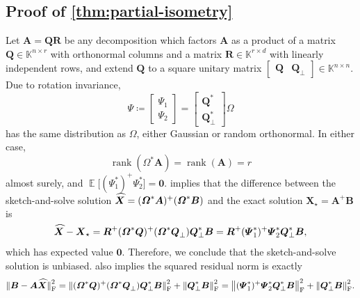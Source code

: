 \documentclass[11pt]{article}
\newcommand{\field}{\mathbb{K}}
\DeclareMathOperator{\rank}{rank}
\newcommand{\mat}[1]{\boldsymbol{#1}}
\newcommand{\norm}[1]{\mleft\| #1 \mright\|}
\newcommand{\twobyone}[2]{%
  \begin{bmatrix}#1 \\ #2\end{bmatrix}}
\DeclareMathOperator{\expect}{\mathbb{E}}
\newcommand{\hatbold}[1]{%
  \skew{4}\widehat{\smash{\boldsymbol{#1}}\mathstrut}}
\newcommand{\Xhat}{\smash{\hatbold{X}}}
\theoremstyle{definition}
\numberwithin{equation}{section}
\begin{document}
\subsection{Proof of \texorpdfstring{\cref{thm:partial-isometry}}{Theorem 2.1}} \label{sec:partial-isometry-proof}

Let $\mat{A} = \mat{Q}\mat{R}$ be any decomposition which factors $\mat{A}$ as a product of a matrix $\mat{Q} \in \field^{n\times r}$ with orthonormal columns and a matrix $\mat{R} \in \field^{r\times d}$ with linearly independent rows, and extend $\mat{Q}$ to a square unitary matrix $[\begin{matrix} \mat{Q} & \mat{Q}_\perp \end{matrix}] \in \field^{n\times n}$.
Due to rotation invariance, 
\begin{equation*}
\mat{\varPsi} \coloneqq \twobyone{\mat{\varPsi}_1}{\mat{\varPsi}_2} = \twobyone{\mat{Q}^*}{\mat{Q}_{\perp}^*} \mat{\varOmega}
\end{equation*}
has the same distribution as $\mat{\varOmega}$, either Gaussian or random orthonormal.
In either case, 
\begin{equation*}
\rank(\mat{\varOmega}^*\mat{A})=\rank(\mat{A})=r
\end{equation*}
almost surely, and $\expect \bigl[(\mat{\varPsi}_1^*)^+ \mat{\varPsi}_2^*\bigr] = \mat{0}$.
 implies that the difference between the sketch-and-solve solution $\Xhat = (\mat{\varOmega}^*\mat{A})^+(\mat{\varOmega}^*\mat{B})$ and the exact solution $\mat{X}_\star = \mat{A}^+\mat{B}$ is
%
\begin{equation*}
    \Xhat - \mat{X}_\star 
    = \mat{R}^+ (\mat{\varOmega}^*\mat{Q})^+(\mat{\varOmega}^*\mat{Q}_\perp^{\vphantom{*}}) \mat{Q}_\perp^*\mat{B}
    = \mat{R}^+ (\mat{\varPsi}_1^*)^+ \mat{\varPsi}_2^* \mat{Q}_\perp^*\mat{B},
\end{equation*}
%
which has expected value $\mat{0}$.
Therefore, we conclude that the sketch-and-solve solution is unbiased.
 also implies the squared residual norm is exactly
\begin{equation*}
    \norm{\mat{B} - \mat{A}\Xhat}_{\rm F}^2
    = \norm{\smash{(\mat{\varOmega}^*\mat{Q})^+(\mat{\varOmega}^*\mat{Q}_\perp^{\vphantom{*}}) \mat{Q}_\perp^*\mat{B}}}_{\rm F}^2 + \norm{\mat{Q}_\perp^*\mat{B}}_{\rm F}^2 
    = \norm{(\mat{\varPsi}_1^*)^+ \mat{\varPsi}_2^* \mat{Q}_{\perp}^* \mat{B}}_{\rm F}^2 + \norm{\mat{Q}_\perp^*\mat{B}}_{\rm F}^2.
\end{equation*}
\end{document}
